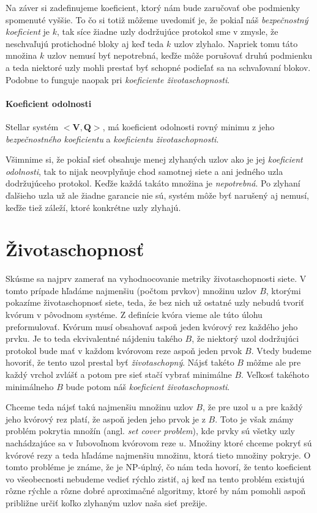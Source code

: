 Na záver si zadefinujeme koeficient, ktorý nám bude zaručovať obe podmienky spomenuté
vyššie. To čo si totiž môžeme uvedomiť je, že pokiaľ náš \textit{bezpečnostný koeficient}
je $k$, tak síce žiadne uzly dodržujúce protokol sme  v zmysle, že
neschvaľujú protichodné bloky aj keď teda $k$ uzlov zlyhalo. Napriek tomu táto
množina $k$ uzlov nemusí byť nepotrebná, keďže môže porušovať druhú podmienku a teda
niektoré uzly mohli prestať byť schopné podieľať sa na schvaľovaní blokov.
Podobne to funguje naopak pri \textit{koeficiente životaschopnosti}.

\paragraph {Koeficient odolnosti} Stellar systém $<\textbf{V},\textbf{Q}>$,
má koeficient odolnosti rovný minimu z jeho \textit{bezpečnostného koeficientu}
a \textit{koeficientu životaschopnosti}.

\vspace{4mm}
Všimnime si, že pokiaľ sieť obsahuje menej zlyhaných uzlov ako je jej
\textit{koeficient odolnosti}, tak to nijak neovplyňuje chod samotnej siete a ani
jedného uzla dodržujúceho protokol. Keďže každá takáto množina je \textit{nepotrebná}.
Po zlyhaní ďalšieho uzla už ale žiadne garancie nie sú, systém môže byť narušený
aj nemusí, keďže tiež záleží, ktoré konkrétne uzly zlyhajú.

\section {Životaschopnosť}

Skúsme sa najprv zamerať na vyhodnocovanie metriky životaschopnosti siete.
V tomto prípade hľadáme najmenšiu (počtom prvkov) množinu uzlov $B$, ktorými
pokazíme životaschopnosť siete, teda, že bez nich už ostatné uzly nebudú
tvoriť kvórum v pôvodnom systéme.
Z definície kvóra vieme ale túto úlohu preformulovať. Kvórum musí obsahovať
aspoň jeden kvórový rez každého jeho prvku.
Je to teda ekvivalentné nájdeniu takého $B$, že niektorý uzol dodržujúci protokol
bude mať v každom kvórovom reze aspoň jeden prvok $B$.
Vtedy budeme hovoriť, že tento uzol prestal byť \textit{životaschopný}.
Nájsť takéto $B$ môžme ale pre každý vrchol zvlášť a potom pre sieť stačí vybrať
minimálne $B$. Veľkosť takéhoto minimálneho $B$ bude potom náš \textit{koeficient
životaschopnosti}.

Chceme teda nájsť takú najmenšiu množinu uzlov $B$, že pre uzol $u$ a pre každý
jeho kvórový rez platí, že aspoň jeden jeho prvok je z $B$.
Toto je však známy problém pokrytia množín (angl. \textit{set cover problem}),
kde prvky sú všetky uzly nachádzajúce sa v ľubovoľnom kvórovom reze $u$.
Množiny ktoré chceme pokryť sú kvórové rezy a teda hľadáme najmenšiu množinu,
ktorá tieto množiny pokryje.
O tomto probléme je známe, že je NP-úplný, čo nám teda hovorí, že tento koeficient
vo všeobecnosti nebudeme vedieť rýchlo zistiť, aj keď na tento problém existujú
rôzne rýchle a rôzne dobré aproximačné algoritmy, ktoré by nám pomohli aspoň
približne určiť koľko zlyhaným uzlov naša sieť prežije.

